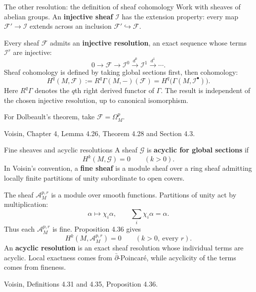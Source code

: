 \documentclass[aspectratio=169,11pt]{beamer}
\newcommand{\db}{\bar\partial}
\newcommand{\A}{\mathcal A}
\newcommand{\F}{\mathcal F}
\newcommand{\src}[1]{\par\vfill{\scriptsize #1\par}}
\begin{document}
\begin{frame}{The other resolution: the definition of sheaf cohomology}
Work with sheaves of abelian groups.
An \textbf{injective sheaf} $\mathcal I$ has the extension property:
every map $\F'\to\mathcal I$ extends across an inclusion
$\F'\hookrightarrow\F$.

Every sheaf $\F$ admits an \textbf{injective resolution}, an exact
sequence whose terms $\mathcal I^r$ are injective:
\[
 0\longrightarrow\F\longrightarrow\mathcal I^0
 \xrightarrow{d^0}\mathcal I^1\xrightarrow{d^1}\cdots.
\]
Sheaf cohomology is defined by taking global sections first,
then cohomology:
\[
 H^q(M,\F):=R^q\Gamma(M,-)(\F)
 =H^q\bigl(\Gamma(M,\mathcal I^\bullet)\bigr).
\]
Here $R^q\Gamma$ denotes the $q$th right derived functor of $\Gamma$.
The result is independent of the chosen injective resolution,
up to canonical isomorphism.

For Dolbeault's theorem, take $\F=\Omega^p_M$.
\src{Voisin, Chapter 4, Lemma 4.26, Theorem 4.28 and Section 4.3.}
\end{frame}

\begin{frame}{Fine sheaves and acyclic resolutions}
A sheaf $\mathcal G$ is \textbf{acyclic for global sections} if
\[
 H^k(M,\mathcal G)=0\qquad(k>0).
\]
In Voisin's convention, a \textbf{fine sheaf} is a module sheaf over
a ring sheaf admitting locally finite partitions of unity
subordinate to open covers.

The sheaf $\A^{p,r}_M$ is a module over smooth functions.
Partitions of unity act by multiplication:
\[
 \alpha\longmapsto\chi_i\alpha,\qquad
 \sum_i\chi_i\alpha=\alpha.
\]
Thus each $\A^{p,r}_M$ is fine. Proposition 4.36 gives
\[
 H^k(M,\A^{p,r}_M)=0\qquad(k>0,\ \text{every }r).
\]
An \textbf{acyclic resolution} is an exact sheaf resolution whose
individual terms are acyclic. Local exactness comes from
$\db$-Poincar\'e, while acyclicity of the terms comes from fineness.
\src{Voisin, Definitions 4.31 and 4.35, Proposition 4.36.}
\end{frame}
\end{document}

